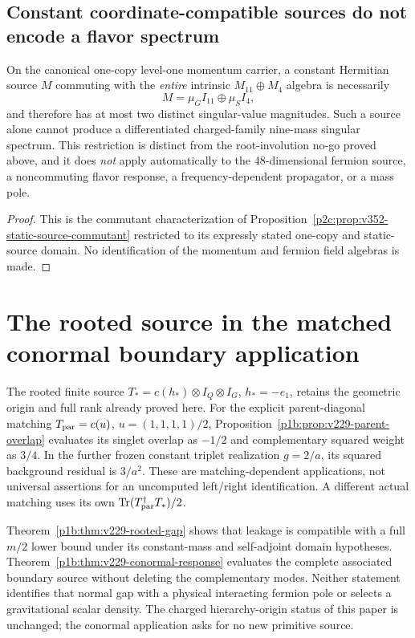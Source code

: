 \documentclass[12pt,a4paper]{article}
\begin{document}
\subsection{Constant coordinate-compatible sources do not encode a flavor spectrum}
\label{p5a:sec:v352-static-source-interface}
\begin{corollary}
\label{p5a:cor:v352-static-source-obstruction}
On the canonical one-copy level-one momentum carrier, a constant
Hermitian source $M$ commuting with the \emph{entire} intrinsic
$M_{11}\oplus M_4$ algebra is necessarily
\[
 \boxed{M=\mu_G I_{11}\oplus\mu_S I_4},
\]
and therefore has at most two distinct singular-value magnitudes.
Such a source alone cannot produce a differentiated charged-family
nine-mass singular spectrum.  This restriction is distinct from the
root-involution no-go proved above, and it does \emph{not} apply
automatically to the $48$-dimensional fermion source, a noncommuting
flavor response, a frequency-dependent propagator, or a mass pole.
\end{corollary}
\begin{proof}
This is the commutant characterization of
Proposition~\ref{p2c:prop:v352-static-source-commutant}
restricted to its expressly stated one-copy and static-source domain.
No identification of the momentum and fermion field algebras is made.
\end{proof}

\printbibliography
\section{The rooted source in the matched conormal boundary application}
\label{p5:sec:v229-rooted-boundary-application}
The rooted finite source $T_*=c(h_*)\otimes I_Q\otimes I_G$,
$h_*=-e_1$, retains the geometric origin and full rank already proved
here. For the explicit parent-diagonal matching $T_{\rm par}=c(u)$,
$u=(1,1,1,1)/2$, Proposition~\ref{p1b:prop:v229-parent-overlap}
evaluates its singlet overlap as $-1/2$ and complementary squared
weight as $3/4$. In the further frozen constant triplet realization
$g=2/a$, its squared background residual is $3/a^2$.
These are matching-dependent applications, not universal assertions for
an uncomputed left/right identification. A different actual matching
uses its own $\operatorname{Tr}(T_{\rm par}^\dagger T_*)/2$.

Theorem~\ref{p1b:thm:v229-rooted-gap} shows that leakage is compatible
with a full $m/2$ lower bound under its constant-mass and self-adjoint
domain hypotheses. Theorem~\ref{p1b:thm:v229-conormal-response}
evaluates the complete associated boundary source without deleting
the complementary modes. Neither statement identifies that normal
gap with a physical interacting fermion pole or selects a gravitational
scalar density. The charged hierarchy-origin status of this paper is
unchanged; the conormal application asks for no new primitive source.
\end{document}
